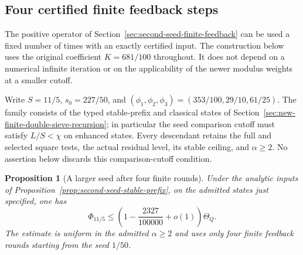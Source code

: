 \documentclass[11pt]{article}
\newtheorem{proposition}[theorem]{Proposition}
\begin{document}
\subsection{Four certified finite feedback steps}
\label{sec:second-seed-certified-finite-feedback}

The positive operator of Section~\ref{sec:second-seed-finite-feedback}
can be used a fixed number of times with an exactly certified input.
The construction below uses the original coefficient $K=681/100$
throughout. It does not depend on a numerical infinite iteration or
on the applicability of the newer modulus weights at a smaller cutoff.

Write $S=11/5$, $s_0=227/50$, and
$(\phi_1,\phi_2,\phi_3)=(353/100,29/10,61/25)$.
The family consists of the typed stable-prefix and classical states
of Section~\ref{sec:new-finite-double-sieve-recursion}; in particular
the seed comparison cutoff must satisfy $L/S<\chi$ on enhanced
states. Every descendant retains the full and selected square tests,
the actual residual level, its stable ceiling, and $\alpha\ge2$.
No assertion below discards this comparison-cutoff condition.

\begin{proposition}[A larger seed after four finite rounds]
\label{prop:second-seed-certified-finite-feedback}
Under the analytic inputs of
Proposition~\ref{prop:second-seed-stable-prefix}, on the admitted
states just specified, one has
\[
 \Phi_{11/5}\le
 \left(1-\frac{2327}{100000}+o(1)\right)\Theta_Q.
\]
The estimate is uniform in the admitted $\alpha\ge2$ and uses only
four finite feedback rounds starting from the seed $1/50$.
\end{proposition}
\end{document}
